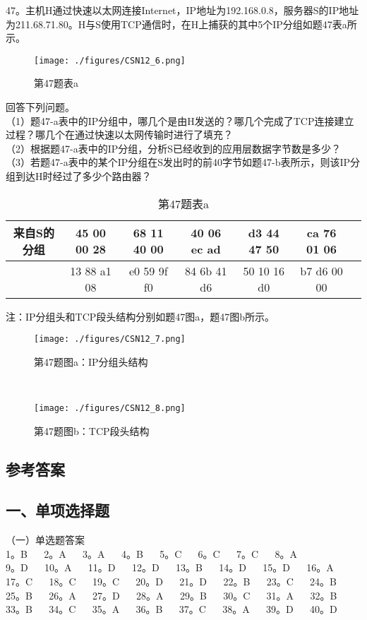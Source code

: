 47。主机H通过快速以太网连接Internet，IP地址为192.168.0.8，服务器S的IP地址为211.68.71.80。H与S使用TCP通信时，在H上捕获的其中5个IP分组如题47表a所示。
\begin{figure}[ht]
\centering
\texttt{[image: ./figures/CSN12\_6.png]}
\caption{第47题表a} \label{CSN12_fig6}
\end{figure}
回答下列问题。\\
（1）题47-a表中的IP分组中，哪几个是由H发送的？哪几个完成了TCP连接建立过程？哪几个在通过快速以太网传输时进行了填充？\\
（2）根据题47-a表中的IP分组，分析S已经收到的应用层数据字节数是多少？\\
（3）若题47-a表中的某个IP分组在S发出时的前40字节如题47-b表所示，则该IP分组到达H时经过了多少个路由器？\\
\begin{table}[ht]
\centering
\caption{第47题表a}\label{CSN12_tab3}
\begin{tabular}{|c|c|c|c|c|c|c|}
\hline
来自S的分组 & 45 00 00 28 & 68 11 40 00 & 40 06 ec ad & d3 44 47 50 & ca 76 01 06 &  \\
\hline
 & 13 88 a1 08 & e0 59 9f f0 & 84 6b 41 d6 & 50 10 16 d0 & b7 d6 00 00 &  \\
\hline
\end{tabular}
\end{table}
注：IP分组头和TCP段头结构分别如题47图a，题47图b所示。\\
\begin{figure}[ht]
\centering
\texttt{[image: ./figures/CSN12\_7.png]}
\caption{第47题图a：IP分组头结构} \label{CSN12_fig7}
\end{figure}\\
\begin{figure}[ht]
\centering
\texttt{[image: ./figures/CSN12\_8.png]}
\caption{第47题图b：TCP段头结构} \label{CSN12_fig8}
\end{figure}

\subsection{参考答案}
\subsection{一、单项选择题}
（一）单选题答案 \\
1。B $\quad$ 2。A $\quad$ 3。A $\quad$ 4。B $\quad$ 5。C $\quad$ 6。C $\quad$ 7。C $\quad$ 8。A \\
9。D $\quad$ 10。A $\quad$ 11。D $\quad$ 12。D $\quad$ 13。B $\quad$ 14。D $\quad$ 15。D $\quad$ 16。A $\quad$ \\
17。C $\quad$ 18。C $\quad$ 19。C $\quad$ 20。D $\quad$ 21。D $\quad$ 22。B $\quad$ 23。C $\quad$ 24。B \\
25。B $\quad$ 26。A $\quad$ 27。D $\quad$ 28。A $\quad$ 29。B  $\quad$ 30。C $\quad$ 31。A $\quad$ 32。B \\
33。B $\quad$ 34。C $\quad$ 35。A $\quad$ 36。B $\quad$ 37。C $\quad$ 38。A $\quad$ 39。D $\quad$ 40。D


